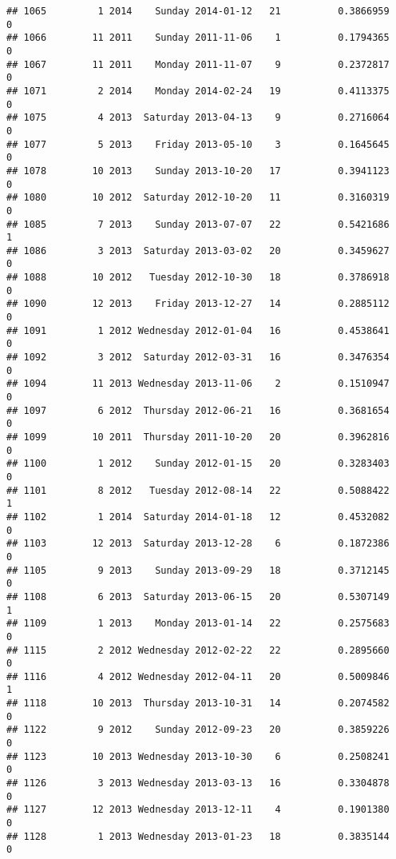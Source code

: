 \documentclass[
]{article}
\begin{document}
\begin{verbatim}
## 1065         1 2014    Sunday 2014-01-12   21          0.3866959             0
## 1066        11 2011    Sunday 2011-11-06    1          0.1794365             0
## 1067        11 2011    Monday 2011-11-07    9          0.2372817             0
## 1071         2 2014    Monday 2014-02-24   19          0.4113375             0
## 1075         4 2013  Saturday 2013-04-13    9          0.2716064             0
## 1077         5 2013    Friday 2013-05-10    3          0.1645645             0
## 1078        10 2013    Sunday 2013-10-20   17          0.3941123             0
## 1080        10 2012  Saturday 2012-10-20   11          0.3160319             0
## 1085         7 2013    Sunday 2013-07-07   22          0.5421686             1
## 1086         3 2013  Saturday 2013-03-02   20          0.3459627             0
## 1088        10 2012   Tuesday 2012-10-30   18          0.3786918             0
## 1090        12 2013    Friday 2013-12-27   14          0.2885112             0
## 1091         1 2012 Wednesday 2012-01-04   16          0.4538641             0
## 1092         3 2012  Saturday 2012-03-31   16          0.3476354             0
## 1094        11 2013 Wednesday 2013-11-06    2          0.1510947             0
## 1097         6 2012  Thursday 2012-06-21   16          0.3681654             0
## 1099        10 2011  Thursday 2011-10-20   20          0.3962816             0
## 1100         1 2012    Sunday 2012-01-15   20          0.3283403             0
## 1101         8 2012   Tuesday 2012-08-14   22          0.5088422             1
## 1102         1 2014  Saturday 2014-01-18   12          0.4532082             0
## 1103        12 2013  Saturday 2013-12-28    6          0.1872386             0
## 1105         9 2013    Sunday 2013-09-29   18          0.3712145             0
## 1108         6 2013  Saturday 2013-06-15   20          0.5307149             1
## 1109         1 2013    Monday 2013-01-14   22          0.2575683             0
## 1115         2 2012 Wednesday 2012-02-22   22          0.2895660             0
## 1116         4 2012 Wednesday 2012-04-11   20          0.5009846             1
## 1118        10 2013  Thursday 2013-10-31   14          0.2074582             0
## 1122         9 2012    Sunday 2012-09-23   20          0.3859226             0
## 1123        10 2013 Wednesday 2013-10-30    6          0.2508241             0
## 1126         3 2013 Wednesday 2013-03-13   16          0.3304878             0
## 1127        12 2013 Wednesday 2013-12-11    4          0.1901380             0
## 1128         1 2013 Wednesday 2013-01-23   18          0.3835144             0

\end{verbatim}
\end{document}
